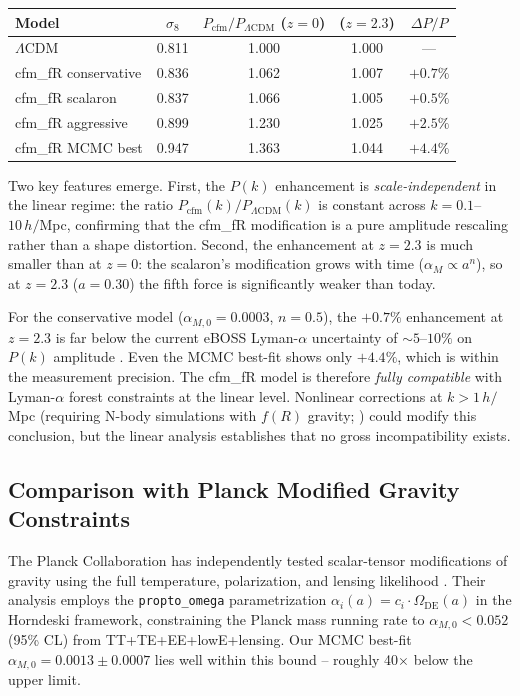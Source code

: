 \documentclass[aps,prd,twocolumn,superscriptaddress,nofootinbib]{revtex4-2}
\begin{document}
\begin{table}
\centering
\begin{tabular}{lcccc}
\toprule
\textbf{Model} & $\sigma_8$ & $P_{\mathrm{cfm}}/P_{\Lambda\mathrm{CDM}}$ ($z{=}0$) & ($z{=}2.3$) & $\Delta P/P$ \\
\midrule
$\Lambda$CDM & 0.811 & 1.000 & 1.000 & --- \\
cfm\_fR conservative & 0.836 & 1.062 & 1.007 & $+0.7\%$ \\
cfm\_fR scalaron & 0.837 & 1.066 & 1.005 & $+0.5\%$ \\
cfm\_fR aggressive & 0.899 & 1.230 & 1.025 & $+2.5\%$ \\
cfm\_fR MCMC best & 0.947 & 1.363 & 1.044 & $+4.4\%$ \\
\bottomrule
\end{tabular}
\end{table}

Two key features emerge. First, the $P(k)$ enhancement is \textit{scale-independent} in the linear regime: the ratio $P_{\mathrm{cfm}}(k)/P_{\Lambda\mathrm{CDM}}(k)$ is constant across $k = 0.1$--$10\,h/$Mpc, confirming that the cfm\_fR modification is a pure amplitude rescaling rather than a shape distortion. Second, the enhancement at $z = 2.3$ is much smaller than at $z = 0$: the scalaron's modification grows with time ($\alpha_M \propto a^n$), so at $z = 2.3$ ($a = 0.30$) the fifth force is significantly weaker than today.

For the conservative model ($\alpha_{M,0} = 0.0003$, $n = 0.5$), the $+0.7\%$ enhancement at $z = 2.3$ is far below the current eBOSS Lyman-$\alpha$ uncertainty of $\sim 5$--$10\%$ on $P(k)$ amplitude \cite{Chabanier2019}. Even the MCMC best-fit shows only $+4.4\%$, which is within the measurement precision. The cfm\_fR model is therefore \textit{fully compatible} with Lyman-$\alpha$ forest constraints at the linear level. Nonlinear corrections at $k > 1\,h/$Mpc (requiring N-body simulations with $f(R)$ gravity; \cite{Li2012}) could modify this conclusion, but the linear analysis establishes that no gross incompatibility exists.


\subsection{Comparison with Planck Modified Gravity Constraints}
\label{subsec:planck_mg}

The Planck Collaboration has independently tested scalar-tensor modifications of gravity using the full temperature, polarization, and lensing likelihood \cite{PlanckMG2016}. Their analysis employs the \texttt{propto\_omega} parametrization $\alpha_i(a) = c_i \cdot \Omega_{\mathrm{DE}}(a)$ in the Horndeski framework, constraining the Planck mass running rate to $\alpha_{M,0} < 0.052$ (95\% CL) from TT+TE+EE+lowE+lensing. Our MCMC best-fit $\alpha_{M,0} = 0.0013 \pm 0.0007$ lies well within this bound -- roughly 40$\times$ below the upper limit.
\end{document}
